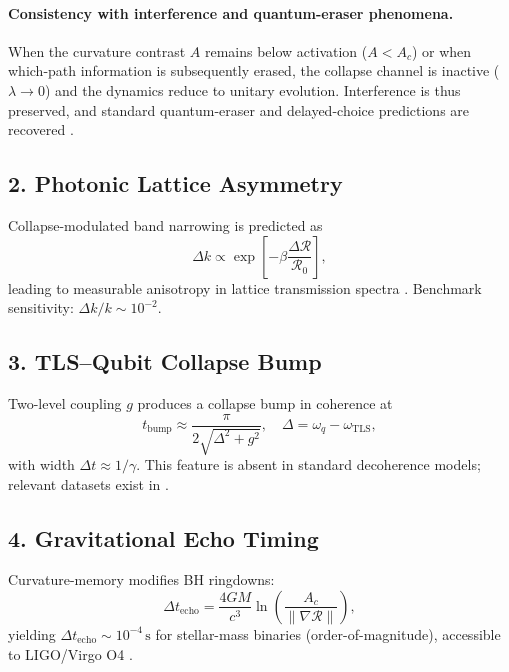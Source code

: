 \documentclass[aps,prl,twocolumn,nofootinbib]{revtex4-2}
\begin{document}
\paragraph*{Consistency with interference and quantum-eraser phenomena.}
When the curvature contrast $A$ remains below activation ($A<A_c$) or when which-path information is subsequently erased, the collapse channel is inactive ($\lambda\to 0$) and the dynamics reduce to unitary evolution. Interference is thus preserved, and standard quantum-eraser and delayed-choice predictions are recovered \cite{ScullyDruhl1982,Kim2000,Walborn2002,Jacques2007}.

\subsection*{2. Photonic Lattice Asymmetry}
Collapse-modulated band narrowing is predicted as
\begin{equation}
\Delta k \propto \exp\!\left[-\beta \frac{\Delta\mathcal{R}}{\mathcal{R}_0}\right],
\end{equation}
leading to measurable anisotropy in lattice transmission spectra \cite{Seron2023}. Benchmark sensitivity: $\Delta k/k \sim 10^{-2}$.

\subsection*{3. TLS--Qubit Collapse Bump}
Two-level coupling $g$ produces a collapse bump in coherence at
\begin{equation}
t_{\text{bump}} \approx \frac{\pi}{2\sqrt{\Delta^2 + g^2}}, \quad 
\Delta = \omega_q - \omega_{\text{TLS}},
\end{equation}
with width $\Delta t \approx 1/\gamma$. This feature is absent in standard decoherence models; relevant datasets exist in \cite{Yu2005,Klimov2018,Burnett2019,Serniak2019}.

\subsection*{4. Gravitational Echo Timing}
Curvature-memory modifies BH ringdowns:
\begin{equation}
\Delta t_{\text{echo}} = \frac{4GM}{c^3} 
\ln\!\left(\frac{A_c}{\|\nabla \mathcal{R}\|}\right),
\end{equation}
yielding $\Delta t_{\text{echo}}\sim10^{-4}\,\mathrm{s}$ for stellar-mass binaries (order-of-magnitude), accessible to LIGO/Virgo O4 \cite{Cardoso2016}.
\end{document}
